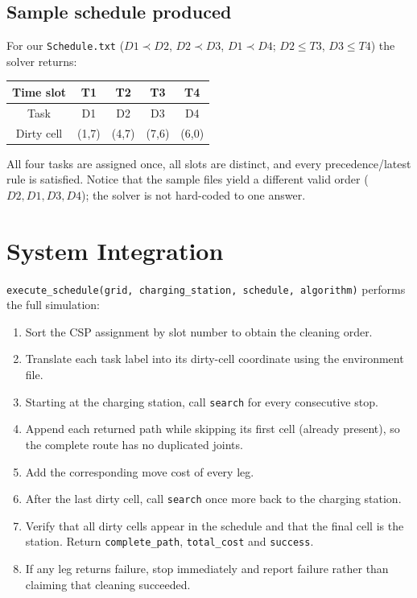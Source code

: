 \documentclass[11pt,a4paper]{article}
\newcommand{\code}[1]{\texttt{#1}}
\begin{document}
\subsection{Sample schedule produced}

For our \code{Schedule.txt} ($D1\!\prec\!D2$, $D2\!\prec\!D3$, $D1\!\prec\!D4$;
$D2\le T3$, $D3\le T4$) the solver returns:

\begin{center}
\begin{tabular}{c|cccc}
Time slot & T1 & T2 & T3 & T4 \\ \hline
Task      & D1 & D2 & D3 & D4 \\
Dirty cell& (1,7) & (4,7) & (7,6) & (6,0) \\
\end{tabular}
\end{center}

All four tasks are assigned once, all slots are distinct, and every precedence/latest rule is
satisfied. Notice that the sample files yield a different valid order
($D2,D1,D3,D4$); the solver is not hard-coded to one answer.

\section{System Integration}

\code{execute\_schedule(grid, charging\_station, schedule, algorithm)} performs the full
simulation:

\begin{enumerate}[leftmargin=1.2cm]
  \item Sort the CSP assignment by slot number to obtain the cleaning order.
  \item Translate each task label into its dirty-cell coordinate using the environment file.
  \item Starting at the charging station, call \code{search} for every consecutive stop.
  \item Append each returned path while skipping its first cell (already present), so the
        complete route has no duplicated joints.
  \item Add the corresponding move cost of every leg.
  \item After the last dirty cell, call \code{search} once more back to the charging station.
  \item Verify that all dirty cells appear in the schedule and that the final cell is the station.
        Return \code{complete\_path}, \code{total\_cost} and \code{success}.
  \item If any leg returns failure, stop immediately and report failure rather than claiming
        that cleaning succeeded.
\end{enumerate}
\end{document}
